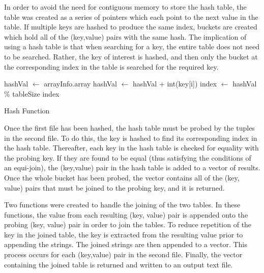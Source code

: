 \documentclass[12pt,twocolumn]{witseiepaper}
\begin{document}
In order to avoid the need for contiguous memory to store the hash table, the table was created as a series of pointers which each point to the next value in the table. If multiple keys are hashed to produce the same index, buckets are created which hold all of the (key,value) pairs with the same hash. The implication of using a hash table is that when searching for a key, the entire table does not need to be searched. Rather, the key of interest is hashed, and then only the bucket at the corresponding index in the table is searched for the required key.
{
\begin{algorithm}[htbp]
	\begin{algorithmic}
		\State hashVal $\leftarrow$ arrayInfo.\textunderscore array
		\State hashVal $\leftarrow$ hashVal + int(key[i])
		\EndFor
		\State index $\leftarrow$ hashVal \% tableSize
		\State \Return index \\
		\EndFunction
		\caption{Hash Function}
		\label{alg:2}
	\end{algorithmic}
\end{algorithm}
}


Once the first file has been hashed, the hash table must be probed by the tuples in the second file. To do this, the key is hashed to find its corresponding index in the hash table. Thereafter, each key in the hash table is checked for equality with the probing key. If they are found to be equal (thus satisfying the conditions of an equi-join), the (key,value) pair in the hash table is added to a vector of results. Once the whole bucket has been probed, the vector contains all of the (key, value) pairs that must be joined to the probing key, and it is returned.

Two functions were created to handle the joining of the two tables. In these functions, the value from each resulting (key, value) pair is appended onto the probing (key, value) pair in order to join the tables. To reduce repetition of the key in the joined table, the key is extracted from the resulting value prior to appending the strings. The joined strings are then appended to a vector. This process occurs for each (key,value) pair in the second file. Finally, the vector containing the joined table is returned and written to an output text file.
\end{document}
